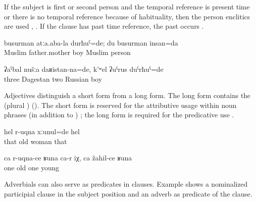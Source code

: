 If the subject is first or second person and the temporal reference is present time or there is no temporal reference because of habituality, then the person enclitics are used , . If the clause has past time reference, the past  occurs .

\begin{exe}
	\ex	\label{ex:‎I was the son of Muslim parents; I am a Muslim}
	\gll	busurman	atːa.aba-la	durħuˁ=de; du	busurman	insan=da\\
		Muslim father.mother	boy		Muslim	person		\\
	\glt	{}

	\ex	\label{ex:‎We three were from Daghestan, and there were two Russian guys}
	\gll	ʡaˁbal	nušːa	daʁistan-na=de,	k'ʷel	ʡuˁrus	duˁrħuˁ=de\\
		three		Dagestan	two	Russian	boy\\
	\glt	{}
\end{exe}


Adjectives distinguish a short form from a long form. The long form contains the   (plural ) (). The short form is reserved for the attributive usage within noun phrases (in addition to ) ; the long form is required for the predicative use . 

\begin{exe}
	\ex	\label{ex:‎‎‎She was an old woman}
	\gll	hel	r-uqna	xːunul=de	hel\\
		that	old	woman	that\\
	\glt	{}

	\ex	\label{ex:One is like old, one like young}
	\gll	ca	r-uqna-ce	ʁuna	ca-r	iχ,	ca	žahil-ce	ʁuna\\
		one	old				one	young		\\
	\glt	{}
\end{exe}

Adverbials can also serve as predicates in  clauses. Example  shows a nominalized participial clause in the subject position and an adverb as predicate of the  clause.

